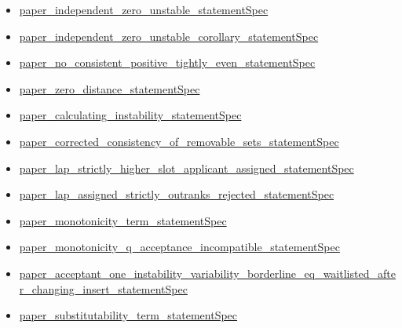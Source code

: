 \documentclass[10pt]{article}
\begin{document}
\begin{itemize}[leftmargin=1.2em]
\begin{itemize}[leftmargin=1.2em]
\item \hyperlink{source-claim-b05952c99a84b6af}{paper\_\allowbreak{}independent\_\allowbreak{}zero\_\allowbreak{}unstable\_\allowbreak{}statement\allowbreak{}Spec}
\item \hyperlink{source-claim-d920f9b7847b2baa}{paper\_\allowbreak{}independent\_\allowbreak{}zero\_\allowbreak{}unstable\_\allowbreak{}corollary\_\allowbreak{}statement\allowbreak{}Spec}
\item \hyperlink{source-claim-18a641b7c4365d27}{paper\_\allowbreak{}no\_\allowbreak{}consistent\_\allowbreak{}positive\_\allowbreak{}tightly\_\allowbreak{}even\_\allowbreak{}statement\allowbreak{}Spec}
\item \hyperlink{source-claim-1daa198b9d0a1bc3}{paper\_\allowbreak{}zero\_\allowbreak{}distance\_\allowbreak{}statement\allowbreak{}Spec}
\item \hyperlink{source-claim-760d01f2c31e3672}{paper\_\allowbreak{}calculating\_\allowbreak{}instability\_\allowbreak{}statement\allowbreak{}Spec}
\item \hyperlink{source-claim-72ba750e0e18812e}{paper\_\allowbreak{}corrected\_\allowbreak{}consistency\_\allowbreak{}of\_\allowbreak{}removable\_\allowbreak{}sets\_\allowbreak{}statement\allowbreak{}Spec}
\item \hyperlink{source-claim-7d8732899c3f4210}{paper\_\allowbreak{}lap\_\allowbreak{}strictly\_\allowbreak{}higher\_\allowbreak{}slot\_\allowbreak{}applicant\_\allowbreak{}assigned\_\allowbreak{}statement\allowbreak{}Spec}
\item \hyperlink{source-claim-5e3bd8769e715d3c}{paper\_\allowbreak{}lap\_\allowbreak{}assigned\_\allowbreak{}strictly\_\allowbreak{}outranks\_\allowbreak{}rejected\_\allowbreak{}statement\allowbreak{}Spec}
\item \hyperlink{source-claim-14ff35045a22028c}{paper\_\allowbreak{}monotonicity\_\allowbreak{}term\_\allowbreak{}statement\allowbreak{}Spec}
\item \hyperlink{source-claim-43c4c9b7821d369a}{paper\_\allowbreak{}monotonicity\_\allowbreak{}q\_\allowbreak{}acceptance\_\allowbreak{}incompatible\_\allowbreak{}statement\allowbreak{}Spec}
\item \hyperlink{source-claim-f926138cb2114337}{paper\_\allowbreak{}acceptant\_\allowbreak{}one\_\allowbreak{}instability\_\allowbreak{}variability\_\allowbreak{}borderline\_\allowbreak{}eq\_\allowbreak{}waitlisted\_\allowbreak{}after\_\allowbreak{}changing\_\allowbreak{}insert\_\allowbreak{}statement\allowbreak{}Spec}
\item \hyperlink{source-claim-ef4d58145103cd0c}{paper\_\allowbreak{}substitutability\_\allowbreak{}term\_\allowbreak{}statement\allowbreak{}Spec}

\end{itemize}
\end{itemize}
\end{document}
